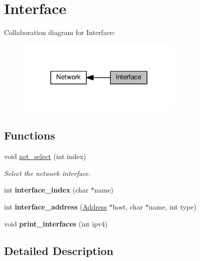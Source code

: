 \hypertarget{group__interface}{}\section{Interface}
\label{group__interface}
Collaboration diagram for Interface\+:\nopagebreak
\begin{figure}[H]
\begin{center}
\leavevmode
\includegraphics[width=224pt]{group__interface}
\end{center}
\end{figure}
\subsection*{Functions}
\begin{DoxyCompactItemize}
\item 
\mbox{\label{group__interface_ga0598afb07d91030ed275699afbb51747}} 
void \hyperlink{group__interface_ga0598afb07d91030ed275699afbb51747}{net\+\_\+select} (int index)
\begin{DoxyCompactList}\small\item\em Select the network interface. \end{DoxyCompactList}\item 
\mbox{\label{group__interface_ga548017d37ed2937898f844fa9d2dc2cf}} 
int {\bfseries interface\+\_\+index} (char $\ast$name)
\item 
\mbox{\label{group__interface_gaa614bd18af3aa8b37c41e208a7486002}} 
int {\bfseries interface\+\_\+address} (\hyperlink{group__address_ga80f2dcdb3778441e85ac8c9dbb6f324a}{Address} $\ast$host, char $\ast$name, int type)
\item 
\mbox{\label{group__interface_ga41f290e70644dbeb15b039316261215d}} 
void {\bfseries print\+\_\+interfaces} (int ipv4)
\end{DoxyCompactItemize}


\subsection{Detailed Description}

